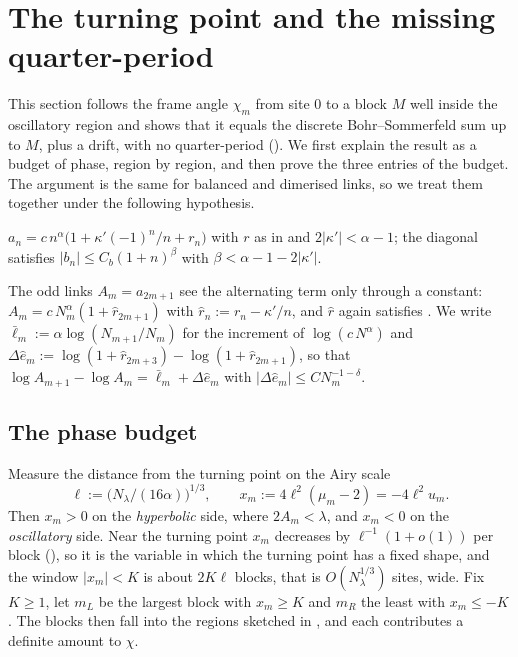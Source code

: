 \section{The turning point and the missing quarter-period}\label{sec:turning}

This section follows the frame angle $\chi_m$ from site $0$ to a block $M$ well inside the
oscillatory region and shows that it equals the discrete Bohr--Sommerfeld sum up to $M$,
plus a drift, with no quarter-period (). We first explain the
result as a budget of phase, region by region, and then prove the three entries of the
budget. The argument is the same for balanced and dimerised links, so we treat them
together under the following hypothesis.

\begin{hypothesis}\label{hyp:Hk}
$a_n=c\,n^\alpha\bigl(1+\kappa'(-1)^n/n+r_n\bigr)$ with $r$ as in  and
$2|\kappa'|<\alpha-1$; the diagonal satisfies $|b_n|\le C_b(1+n)^\beta$ with
$\beta<\alpha-1-2|\kappa'|$.
\end{hypothesis}

\noindent The odd links $A_m=a_{2m+1}$ see the alternating term only through a constant:
$A_m=c\,N_m^\alpha(1+\hat r_{2m+1})$ with $\hat r_n:=r_n-\kappa'/n$, and $\hat r$ again
satisfies . We write $\bar\ell_m:=\alpha\log(N_{m+1}/N_m)$ for the increment of
$\log(c\,N^\alpha)$ and $\Delta\hat e_m:=\log(1+\hat r_{2m+3})-\log(1+\hat r_{2m+1})$,
so that $\log A_{m+1}-\log A_m=\bar\ell_m+\Delta\hat e_m$ with $|\Delta\hat e_m|\le CN_m^{-1-\delta}$.

\subsection{The phase budget}

Measure the distance from the turning point on the Airy scale
\begin{equation}\label{eq:ell}
  \ell:=\bigl(N_\lambda/(16\alpha)\bigr)^{1/3},\qquad x_m:=4\ell^2(\mu_m-2)=-4\ell^2u_m .
\end{equation}
Then $x_m>0$ on the \emph{hyperbolic} side, where $2A_m<\lambda$, and $x_m<0$ on the
\emph{oscillatory} side. Near the turning point $x_m$ decreases by $\ell^{-1}(1+o(1))$ per
block (), so it is the variable in which the turning point has a fixed
shape, and the window $|x_m|<K$ is about $2K\ell$ blocks, that is $O(N_\lambda^{1/3})$ sites,
wide. Fix $K\ge1$, let $m_L$ be the largest block with $x_m\ge K$ and $m_R$ the least
with $x_m\le-K$. The blocks then fall into the regions sketched in , and
each contributes a definite amount to $\chi$.

